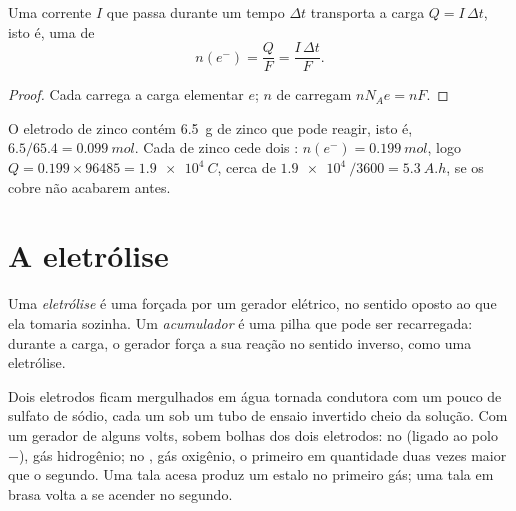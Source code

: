\begin{proposition}\label{prop:g12:cells-and-electrolysis:charge}
Uma corrente $I$ que passa durante um tempo $\Delta t$ transporta a
carga $Q = I\,\Delta t$, isto é, uma  de 
\[
  n(e^-) = \frac{Q}{F} = \frac{I\,\Delta t}{F} .
\]
\end{proposition}

\begin{proof}
Cada  carrega a carga elementar $e$; $n$  de 
carregam $n N_A e = n F$.
\end{proof}

\begin{example}\label{ex:g12:cells-and-electrolysis:capacity}
O eletrodo de zinco contém \qty{6.5}{g} de zinco que pode reagir, isto
é, $6.5/65.4 = \qty{0.099}{mol}$. Cada  de zinco cede dois
: $n(e^-) = \qty{0.199}{mol}$, logo $Q = 0.199 \times 96485 = \qty{1.9e4}{C}$,
cerca de $\qty{1.9e4}{}/3600 = \qty{5.3}{A.h}$, se os  cobre não
acabarem antes.
\end{example}

\section{A eletrólise}

\begin{definition}\label{def:g12:cells-and-electrolysis:electrolysis}
Uma \emph{eletrólise} é uma 
forçada por um gerador elétrico, no sentido oposto ao que ela tomaria
sozinha. Um \emph{acumulador} é uma pilha que pode ser
recarregada: durante a carga, o gerador força a sua reação no sentido
inverso, como uma eletrólise.
\end{definition}

\begin{inthelab}
Dois eletrodos ficam mergulhados em água tornada condutora com um pouco
de sulfato de sódio, cada um sob um tubo de ensaio invertido cheio da
solução. Com um gerador de alguns volts, sobem bolhas dos dois
eletrodos: no  (ligado ao polo $-$), gás hidrogênio; no , gás
oxigênio, o primeiro em quantidade duas vezes maior que o segundo. Uma
tala acesa produz um estalo no primeiro gás; uma tala em brasa volta a
se acender no segundo.
\end{inthelab}

